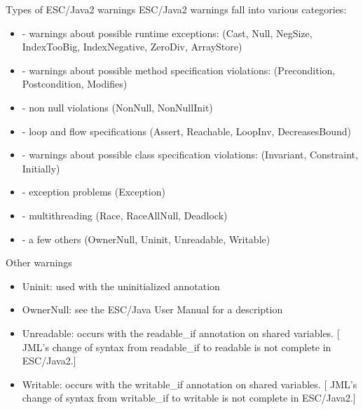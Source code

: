 \documentclass[
pdf,
nocolorBG,
slideColor,
cok,
]{prosper}
\begin{document}
\begin{slide}{Types of ESC/Java2 warnings}
\vspace*{-6ex}
ESC/Java2 warnings fall into various categories:
\begin{itemize}

\item[] - {\gray warnings about possible { runtime exceptions}:
(Cast, Null, NegSize, IndexTooBig, IndexNegative, ZeroDiv, ArrayStore)}

\item[] - {\gray warnings about possible method { specification violations}:
(Precondition, Postcondition, Modifies)}

\item[] - {\gray non null violations (NonNull, NonNullInit)}

\item[] - {\gray loop and flow specifications (Assert, Reachable, LoopInv, DecreasesBound)}

\item[] - { \gray warnings about possible class specification violations:
(Invariant, Constraint, Initially)}


\item[] - {\gray exception problems (Exception)}

\item[] - {\gray multithreading (Race, RaceAllNull, Deadlock)}

\item[] - a few others (OwnerNull, Uninit, Unreadable, Writable)

\end{itemize}
\end{slide}

\begin{slide}{Other warnings}

\vspace*{-6ex}
\begin{itemize}
\item {\knalblue Uninit}: used with the {\blue uninitialized} annotation
\item {\knalblue OwnerNull}: see the ESC/Java User Manual for a description
\item {\knalblue Unreadable}: occurs with the {\blue readable\_if} annotation on shared variables.
[ JML's change of syntax from {\blue readable\_if} to {\blue readable} is not complete in ESC/Java2.]
\item {\knalblue Writable}: occurs with the {\blue writable\_if} annotation on shared variables.
[ JML's change of syntax from {\blue writable\_if} to {\blue writable} is not complete in ESC/Java2.]
\end{itemize}
\end{slide}
\end{document}
